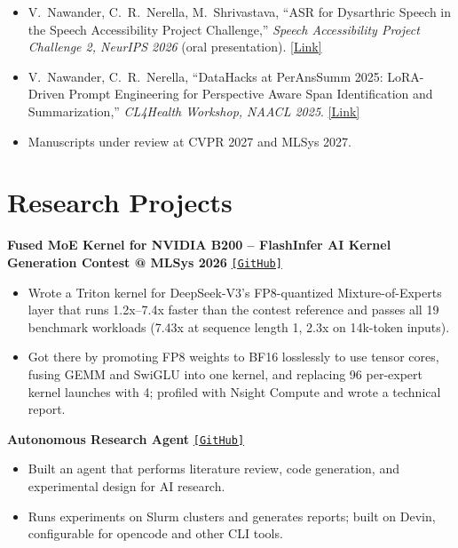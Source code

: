 \documentclass[letterpaper,10pt]{article}
\newcommand{\entrygap}{\vspace{4pt}}
\begin{document}
\begin{itemize}
  \item V.\ Nawander, C.\ R.\ Nerella, M.\ Shrivastava, ``ASR for Dysarthric Speech in the Speech Accessibility Project Challenge,''
        \textit{Speech Accessibility Project Challenge 2, NeurIPS 2026} (oral presentation).
        \href{https://neurips.cc/virtual/2026/181059}{[Link]}
  \item V.\ Nawander, C.\ R.\ Nerella, ``DataHacks at PerAnsSumm 2025: LoRA-Driven Prompt Engineering for Perspective Aware Span Identification and Summarization,''
        \textit{CL4Health Workshop, NAACL 2025}.
        \href{https://aclanthology.org/2025.cl4health-1.33/}{[Link]}
  \item Manuscripts under review at CVPR 2027 and MLSys 2027.
\end{itemize}

\section{Research Projects}

\textbf{Fused MoE Kernel for NVIDIA B200 -- FlashInfer AI Kernel Generation Contest @ MLSys 2026} \hfill
\href{https://github.com/vanshnawander/flashinfer-mlsys}{\texttt{[GitHub]}}
\begin{itemize}
  \item Wrote a Triton kernel for DeepSeek-V3's FP8-quantized Mixture-of-Experts layer that runs 1.2x--7.4x faster than the contest reference and passes all 19 benchmark workloads (7.43x at sequence length 1, 2.3x on 14k-token inputs).
  \item Got there by promoting FP8 weights to BF16 losslessly to use tensor cores, fusing GEMM and SwiGLU into one kernel, and replacing 96 per-expert kernel launches with 4; profiled with Nsight Compute and wrote a technical report.
\end{itemize}

\entrygap
\textbf{Autonomous Research Agent} \hfill
\href{https://github.com/vanshnawander/autonomus-agent}{\texttt{[GitHub]}}
\begin{itemize}
  \item Built an agent that performs literature review, code generation, and experimental design for AI research.
  \item Runs experiments on Slurm clusters and generates reports; built on Devin, configurable for opencode and other CLI tools.
\end{itemize}
\end{document}
